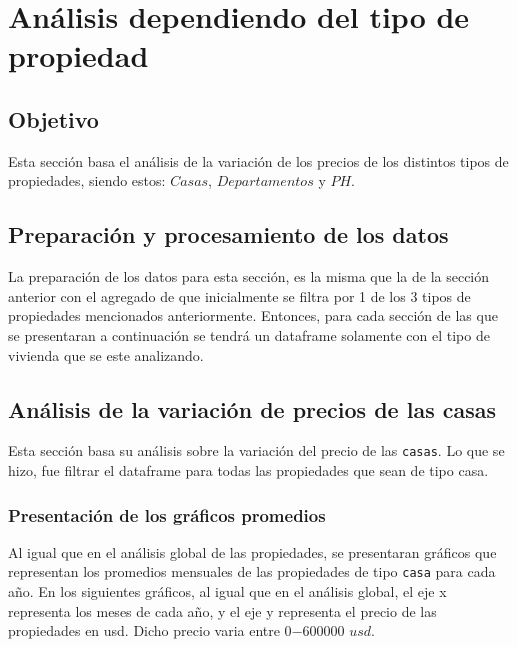 \documentclass[a4paper, 10pt]{article}
\def\code#1{\texttt{#1}}
\newcommand\tab[1][0.5cm]{\hspace*{#1}}
\begin{document}
  \section{Análisis dependiendo del tipo de propiedad}

    \subsection{Objetivo}
      \tab Esta sección basa el análisis de la variación de los precios de los distintos tipos de propiedades, siendo estos: \code{$Casas$}, \code{$Departamentos$} y \code{$PH$}.

    \subsection{Preparación y procesamiento de los datos}
      \tab La preparación de los datos para esta sección, es la misma que la de la sección anterior con el agregado de que inicialmente se filtra por 1 de los 3 tipos de propiedades mencionados anteriormente. Entonces, para cada sección de las que se presentaran a continuación se tendrá un dataframe solamente con el tipo de vivienda que se este analizando.

    \subsection{Análisis de la variación de precios de las casas}

      \tab Esta sección basa su análisis sobre la variación del precio de las \code{casas}. Lo que se hizo, fue filtrar el dataframe para todas las propiedades que sean de tipo casa.

      \subsubsection{Presentación de los gráficos promedios}

        \tab Al igual que en el análisis global de las propiedades, se presentaran gráficos que representan los promedios mensuales de las propiedades de tipo \code{casa} para cada año. En los siguientes gráficos, al igual que en el análisis global, el eje x representa los meses de cada año, y el eje y representa el precio de las propiedades en usd. Dicho precio varia entre 0$-$600000 $usd$.
\end{document}
